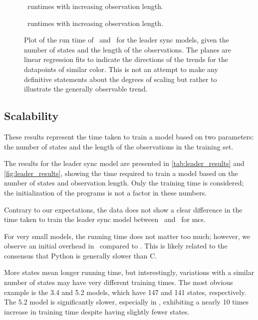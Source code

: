\begin{figure}
    
    \caption{\Cupaal\ runtimes with increasing observation length.}
    \label{fig:cupaal-length-to-runtime}
\end{figure}


\begin{figure}
    
    \caption{\Jajapy\ runtimes with increasing observation length.}
    \label{fig:jajapy-length-to-runtime}
\end{figure}


\begin{figure*}
    \centering
    
    \caption{Plot of the run time of \Jajapy\ and \Cupaal\ for the leader sync models, given the number of states and the length of the observations. The planes are linear regression fits to indicate the directions of the trends for the datapoints of similar color. This is not an attempt to make any definitive statements about the degrees of scaling but rather to illustrate the generally observable trend.}
    \label{fig:leader_results}
\end{figure*}


\subsection{Scalability}\label{subsec:scalability}
These results represent the time taken to train a model based on two parameters: the number of states and the length of the observations in the training set.

The results for the leader sync model are presented in \autoref{tab:leader_results} and \autoref{fig:leader_results}, showing the time required to train a model based on the number of states and observation length. Only the training time is considered; the initialization of the programs is not a factor in these numbers.

Contrary to our expectations, the data does not show a clear difference in the time taken to train the leader sync model between \Jajapy\ and \Cupaal\ for \glspl{mc}.

For very small models, the running time does not matter too much; however, we observe an initial overhead in \Jajapy\ compared to \Cupaal. This is likely related to the consensus that Python is generally slower than C.

More states mean longer running time, but interestingly, variations with a similar number of states may have very different training times.
The most obvious example is the 3.4 and 5.2 models, which have 147 and 141 states, respectively.
The 5.2 model is significantly slower, especially in \Cupaal, exhibiting a nearly 10 times increase in training time despite having slightly fewer states.

